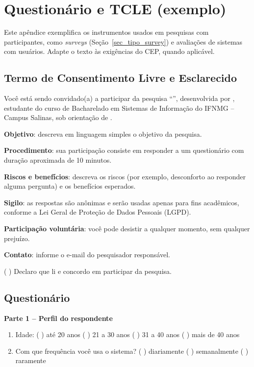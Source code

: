 \chapter{Questionário e TCLE (exemplo)}
\label{apC_questionario}

Este apêndice exemplifica os instrumentos usados em pesquisas com participantes, como \textit{surveys} (Seção~\ref{sec_tipo_survey}) e avaliações de sistemas com usuários. Adapte o texto às exigências do CEP, quando aplicável.

\section{Termo de Consentimento Livre e Esclarecido}

Você está sendo convidado(a) a participar da pesquisa \enquote{\imprimirtitulo}, desenvolvida por \imprimirautor, estudante do curso de Bacharelado em Sistemas de Informação do IFNMG -- Campus Salinas, sob orientação de \imprimirorientador.

\textbf{Objetivo}: descreva em linguagem simples o objetivo da pesquisa.

\textbf{Procedimento}: sua participação consiste em responder a um questionário com duração aproximada de 10 minutos.

\textbf{Riscos e benefícios}: descreva os riscos (por exemplo, desconforto ao responder alguma pergunta) e os benefícios esperados.

\textbf{Sigilo}: as respostas são anônimas e serão usadas apenas para fins acadêmicos, conforme a Lei Geral de Proteção de Dados Pessoais (LGPD).

\textbf{Participação voluntária}: você pode desistir a qualquer momento, sem qualquer prejuízo.

\textbf{Contato}: informe o e-mail do pesquisador responsável.

\vspace{0.5cm}
\noindent ( \quad ) Declaro que li e concordo em participar da pesquisa.

\section{Questionário}

\textbf{Parte 1 -- Perfil do respondente}

\begin{enumerate}
	\item Idade: ( \quad ) até 20 anos \quad ( \quad ) 21 a 30 anos \quad ( \quad ) 31 a 40 anos \quad ( \quad ) mais de 40 anos
	\item Com que frequência você usa o sistema? ( \quad ) diariamente \quad ( \quad ) semanalmente \quad ( \quad ) raramente
\end{enumerate}

